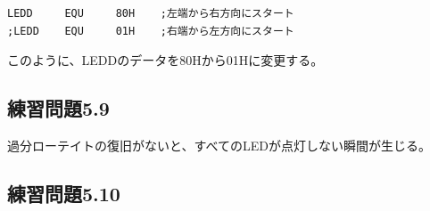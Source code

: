 \documentclass[a4paper,12pt]{ujarticle}
\begin{document}
  \begin{lstlisting}[basicstyle=\ttfamily\footnotesize, frame=single]
LEDD     EQU     80H    ;左端から右方向にスタート
;LEDD    EQU     01H    ;右端から左方向にスタート
  \end{lstlisting}
  このように、LEDDのデータを80Hから01Hに変更する。
  \subsection{練習問題5.9}
  過分ローテイトの復旧がないと、すべてのLEDが点灯しない瞬間が生じる。
  \subsection{練習問題5.10}
  \clearpage
\end{document}
